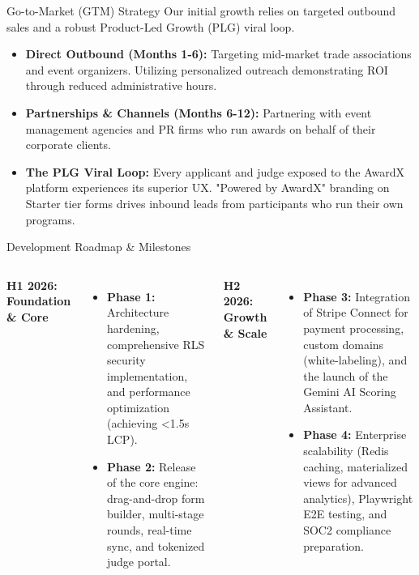 \documentclass[aspectratio=169, 10pt]{beamer}
\begin{document}
\begin{frame}{Go-to-Market (GTM) Strategy}
    Our initial growth relies on targeted outbound sales and a robust Product-Led Growth (PLG) viral loop.
    
    \vspace{0.4cm}
    \begin{itemize}
        \item \textbf{Direct Outbound (Months 1-6):} Targeting mid-market trade associations and event organizers. Utilizing personalized outreach demonstrating ROI through reduced administrative hours.
        \vspace{0.2cm}
        \item \textbf{Partnerships \& Channels (Months 6-12):} Partnering with event management agencies and PR firms who run awards on behalf of their corporate clients.
        \vspace{0.2cm}
        \item \textbf{The PLG Viral Loop:} Every applicant and judge exposed to the AwardX platform experiences its superior UX. "Powered by AwardX" branding on Starter tier forms drives inbound leads from participants who run their own programs.
    \end{itemize}
\end{frame}

\begin{frame}{Development Roadmap \& Milestones}
    \begin{columns}[T]
        \textbf{H1 2026: Foundation \& Core}
        \begin{itemize}
            \item \textbf{Phase 1:} Architecture hardening, comprehensive RLS security implementation, and performance optimization (achieving <1.5s LCP).
            \item \textbf{Phase 2:} Release of the core engine: drag-and-drop form builder, multi-stage rounds, real-time sync, and tokenized judge portal.
        \end{itemize}
        
        \textbf{H2 2026: Growth \& Scale}
        \begin{itemize}
            \item \textbf{Phase 3:} Integration of Stripe Connect for payment processing, custom domains (white-labeling), and the launch of the Gemini AI Scoring Assistant.
            \item \textbf{Phase 4:} Enterprise scalability (Redis caching, materialized views for advanced analytics), Playwright E2E testing, and SOC2 compliance preparation.
        \end{itemize}
    \end{columns}
\end{frame}
\end{document}
